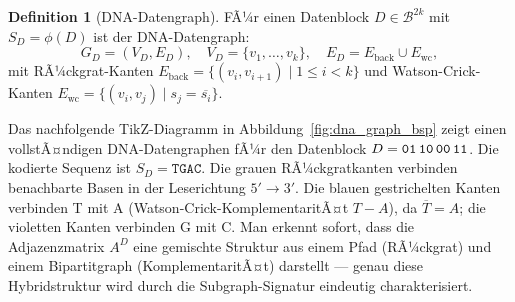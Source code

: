 ﻿\documentclass[a4paper,12pt]{article}
\theoremstyle{definition}
\newtheorem{definition}{Definition}[section]
\theoremstyle{plain}
\begin{document}
\begin{definition}[DNA-Datengraph]
\label{def:dna_graph}
  FÃ¼r einen Datenblock $D \in \mathcal{B}^{2k}$ mit $S_D = \phi(D)$ ist
  der DNA-Datengraph:
  \[
    G_D = (V_D, E_D),
    \quad V_D = \{v_1, \ldots, v_k\},
    \quad E_D = E_{\mathrm{back}} \cup E_{\mathrm{wc}},
  \]
  mit RÃ¼ckgrat-Kanten $E_{\mathrm{back}} = \{(v_i, v_{i+1}) \mid 1 \le i < k\}$
  und Watson-Crick-Kanten $E_{\mathrm{wc}} = \{(v_i, v_j) \mid s_j = \overline{s_i}\}$.
\end{definition}

Das nachfolgende TikZ-Diagramm in Abbildung~\ref{fig:dna_graph_bsp} zeigt
einen vollstÃ¤ndigen DNA-Datengraphen fÃ¼r den Datenblock
$D = \texttt{01\,10\,00\,11}$.  Die kodierte Sequenz ist
$S_D = \texttt{TGAC}$.  Die grauen RÃ¼ckgratkanten verbinden benachbarte
Basen in der Leserichtung $5' \to 3'$.  Die blauen gestrichelten Kanten
verbinden T mit A (Watson-Crick-KomplementaritÃ¤t $T{-}A$), da
$\overline{T} = A$; die violetten Kanten verbinden G mit C.
Man erkennt sofort, dass die Adjazenzmatrix $A^D$ eine gemischte Struktur
aus einem Pfad (RÃ¼ckgrat) und einem Bipartitgraph (KomplementaritÃ¤t)
darstellt --- genau diese Hybridstruktur wird durch die Subgraph-Signatur
eindeutig charakterisiert.
\end{document}
